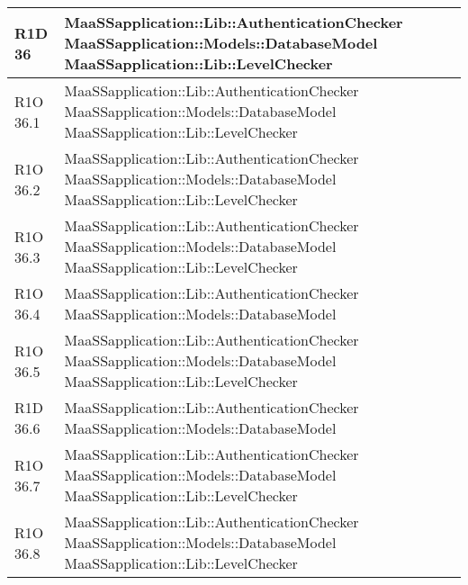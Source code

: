 \begin{center}
\begin{longtable}{ | l | p{8cm} |}
    R1D 36 & MaaSSapplication::Lib::AuthenticationChecker \newline  MaaSSapplication::Models::DatabaseModel \newline MaaSSapplication::Lib::LevelChecker \\ \hline
        
    R1O 36.1 & MaaSSapplication::Lib::AuthenticationChecker \newline  MaaSSapplication::Models::DatabaseModel \newline MaaSSapplication::Lib::LevelChecker \\ \hline
   	      	
      	R1O 36.2 & MaaSSapplication::Lib::AuthenticationChecker \newline  MaaSSapplication::Models::DatabaseModel \newline MaaSSapplication::Lib::LevelChecker \\ \hline
      	
      	R1O 36.3 & MaaSSapplication::Lib::AuthenticationChecker \newline  MaaSSapplication::Models::DatabaseModel \newline MaaSSapplication::Lib::LevelChecker \\ \hline
   	    	
   	R1O 36.4 & MaaSSapplication::Lib::AuthenticationChecker \newline  MaaSSapplication::Models::DatabaseModel \\ \hline
   	
   	R1O 36.5 & MaaSSapplication::Lib::AuthenticationChecker \newline  MaaSSapplication::Models::DatabaseModel \newline MaaSSapplication::Lib::LevelChecker \\ \hline
   	
   	R1D 36.6 & MaaSSapplication::Lib::AuthenticationChecker \newline  MaaSSapplication::Models::DatabaseModel \\ \hline
   	
   	R1O 36.7 & MaaSSapplication::Lib::AuthenticationChecker \newline  MaaSSapplication::Models::DatabaseModel \newline MaaSSapplication::Lib::LevelChecker \\ \hline
   	
   	R1O 36.8 & MaaSSapplication::Lib::AuthenticationChecker \newline  MaaSSapplication::Models::DatabaseModel \newline MaaSSapplication::Lib::LevelChecker \\ \hline
   	

\end{longtable}
\end{center}
